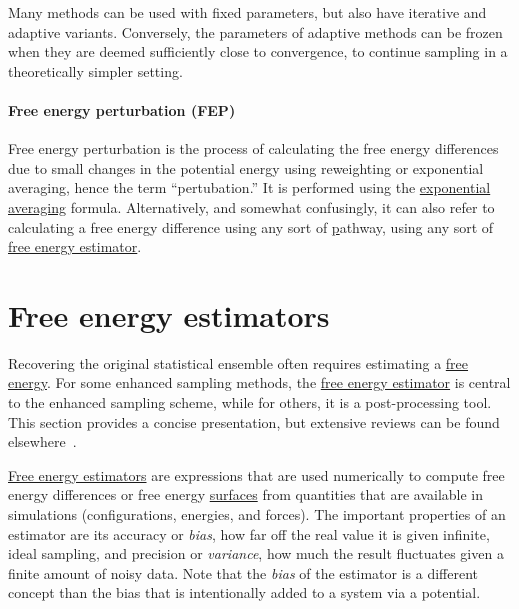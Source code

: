 \documentclass[9pt,review]{livecoms}
\begin{document}
Many methods can be used with fixed parameters, but also have iterative and adaptive variants. Conversely, the parameters of adaptive methods can be frozen when they are deemed sufficiently close to convergence, to continue sampling in a theoretically simpler setting.

\hypertarget{ref:FEP} {\paragraph{Free energy perturbation (FEP)}}
\label{FEP}

Free energy perturbation is the process of calculating the free energy differences due to small changes in the potential energy using reweighting or exponential averaging, hence the term ``pertubation.''  It is performed using the \hyperref[sec:fe_estimators:EXP]{exponential averaging} formula.  Alternatively, and somewhat confusingly, it can also refer to calculating a free energy difference using any sort of \hyperlink{ref:Alchemical} pathway, using any sort of \hyperlink{ref:FEestimator}{free energy estimator}.


\section{Free energy estimators}
\label{sec:fe_estimators}

Recovering the original statistical ensemble often requires estimating a \hyperlink{ref:FE} {free energy}. For some enhanced sampling methods, the \hyperlink{ref:FEestimator} {free energy estimator} is central to the enhanced sampling scheme, while for others, it is a post-processing tool. This section provides a concise presentation, but extensive reviews can be found elsewhere~\cite{cchipot07:molsim, Lelievre2010, Paliwal_comparison_2011, shirts_comparison_2005, Klimovich_Shirts_Mobley_2015}.

\hyperlink{ref:FEestimator} {Free energy estimators} are expressions that are used numerically to compute free energy differences or free energy \hyperlink{ref:FES} {surfaces} from quantities that are available in simulations (configurations, energies, and forces).
The important properties of an estimator are its accuracy or  \textit{bias}, how far off the real value it is given infinite, ideal sampling, and precision or \textit{variance}, how much the result fluctuates given a finite amount of noisy data.  Note that the \textit{bias} of the estimator is a different concept than the bias that is intentionally added to a system via a potential.
\end{document}
